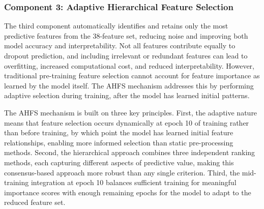\documentclass[journal]{IEEEtran}
\begin{document}
\subsubsection{Component 3: Adaptive Hierarchical Feature Selection}

The third component automatically identifies and retains only the most predictive features from the 38-feature set, reducing noise and improving both model accuracy and interpretability. Not all features contribute equally to dropout prediction, and including irrelevant or redundant features can lead to overfitting, increased computational cost, and reduced interpretability. However, traditional pre-training feature selection cannot account for feature importance as learned by the model itself. The AHFS mechanism addresses this by performing adaptive selection during training, after the model has learned initial patterns.

The AHFS mechanism is built on three key principles. First, the adaptive nature means that feature selection occurs dynamically at epoch 10 of training rather than before training, by which point the model has learned initial feature relationships, enabling more informed selection than static pre-processing methods. Second, the hierarchical approach combines three independent ranking methods, each capturing different aspects of predictive value, making this consensus-based approach more robust than any single criterion. Third, the mid-training integration at epoch 10 balances sufficient training for meaningful importance scores with enough remaining epochs for the model to adapt to the reduced feature set.
\end{document}
